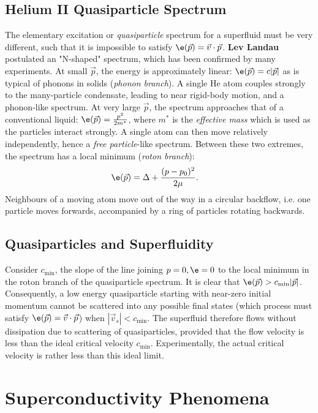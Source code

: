 \documentclass[a4paper, 11pt, normalem]{report}
\begin{document}
\section{Helium II Quasiparticle Spectrum}
The elementary excitation or \emph{quasiparticle} spectrum for a superfluid must be very different, such that it is impossible to satisfy $\e(\vec{p})=\vec{v}\cdot\vec{p}$.
\textbf{Lev Landau} postulated an "N-shaped" spectrum, which has been confirmed by many experiments.
At small $\vec{p}$, the energy is approximately linear: $\e(\vec{p})=c|\vec{p}|$ as is typical of phonons in solids (\emph{phonon branch}).
A single He atom couples strongly to the many-particle condensate, leading to near rigid-body motion, and a phonon-like spectrum.
At very large $\vec{p}$, the spectrum approaches that of a conventional liquid: $\e(\vec{p}) = \frac{p^2}{2m^*}$, where $m^*$ is the \emph{effective mass} which is used as the particles interact strongly.
A single atom can then move relatively independently, hence a \emph{free particle}-like spectrum.
Between these two extremes, the spectrum has a local minimum (\emph{roton branch}):
\begin{align}
    \e(\vec{p}) &= \Delta + \frac{(p-p_0)^2}{2\mu}.
\end{align}
Neighbours of a moving atom move out of the way in a circular backflow, i.e. one particle moves forwards, accompanied by a ring of particles rotating backwards.

\section{Quasiparticles and Superfluidity}
Consider $c_{\text{min}}$, the slope of the line joining $p=0,\e=0$ to the local minimum in the roton branch of the quasiparticle spectrum.
It is clear that $\e(\vec{p})>c_{\text{min}}|\vec{p}|$.
Consequently, a low energy quasiparticle starting with near-zero initial momentum cannot be scattered into any possible final states (which process must satisfy $\e(\vec{p})=\vec{v}\cdot\vec{p}$) when $|\vec{v}_s|<c_{\text{min}}$.
The superfluid therefore flows without dissipation due to scattering of quasiparticles, provided that the flow velocity is less than the ideal critical velocity $c_{\text{min}}$.
Experimentally, the actual critical velocity is rather less than this ideal limit.

\chapter{Superconductivity Phenomena}
\end{document}
